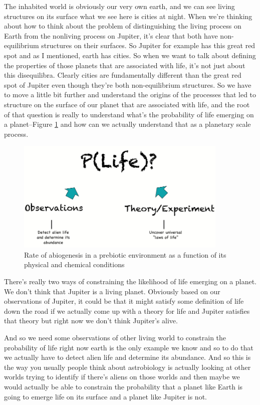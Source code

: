 \documentclass[]{article}
\begin{document}
The inhabited world is obviously our
very own earth, and we can see living
structures on its surface what we see
here is cities at night. When we're
thinking about how to think about the
problem of distinguishing the living
process on Earth from the nonliving
process on Jupiter, it's clear that both
have non-equilibrium structures on
their surfaces. So Jupiter for example
has this great red spot and as I
mentioned, earth has cities. So when we
want to talk about defining the
properties of those planets that are
associated with life, it's not just about
this disequilibra. Clearly cities are
fundamentally different than the great
red spot of Jupiter even though they're
both non-equilibrium structures. So we
have to move a little bit further and
understand the origins of the processes
that led to structure
on the surface of our planet that are
associated with life, and the root of
that question is really to understand
what's the probability of life emerging
on a planet--Figure \ref{fig:P:Life} and how can we actually
understand that as a planetary scale
process. 

\begin{figure}[H]
	\caption[Rate of abiogenesis in a prebiotic environment]{Rate of abiogenesis in a prebiotic environment as a function of its physical and chemical conditions}\label{fig:P:Life}
	\includegraphics[width=0.9\textwidth]{P_Life}
\end{figure}


There's really two ways of
constraining the likelihood of life
emerging on a planet. We don't
think that Jupiter is a living planet. Obviously
based on our observations of Jupiter, it
could be that it might satisfy some
definition of life down the road if we
actually come up with a theory for life
and Jupiter satisfies that theory but
right now we don't think Jupiter's alive.

And so we need some observations of
other living world to constrain the
probability of life right now earth is
the only example we know and so to do
that we actually have to detect alien
life and determine its abundance. And so
this is the way you usually people think
about astrobiology is actually looking
at other worlds trying to identify if
there's aliens on those worlds and then
maybe we would actually be able to
constrain the probability that a planet
like Earth is going to emerge life on
its surface and a planet like Jupiter is
not. 
\end{document}
